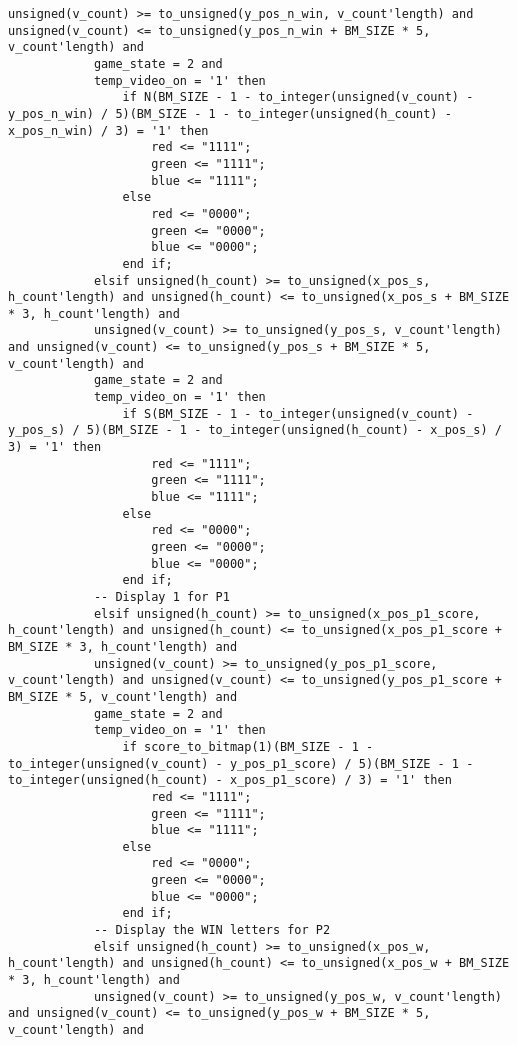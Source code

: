 \documentclass{article}
\begin{document}
\begin{lstlisting}[caption=Draw Process, label=lst:draw-process]
            unsigned(v_count) >= to_unsigned(y_pos_n_win, v_count'length) and unsigned(v_count) <= to_unsigned(y_pos_n_win + BM_SIZE * 5, v_count'length) and
            game_state = 2 and
            temp_video_on = '1' then
                if N(BM_SIZE - 1 - to_integer(unsigned(v_count) - y_pos_n_win) / 5)(BM_SIZE - 1 - to_integer(unsigned(h_count) - x_pos_n_win) / 3) = '1' then
                    red <= "1111";
                    green <= "1111";
                    blue <= "1111";
                else
                    red <= "0000";
                    green <= "0000";
                    blue <= "0000";
                end if;
            elsif unsigned(h_count) >= to_unsigned(x_pos_s, h_count'length) and unsigned(h_count) <= to_unsigned(x_pos_s + BM_SIZE * 3, h_count'length) and
            unsigned(v_count) >= to_unsigned(y_pos_s, v_count'length) and unsigned(v_count) <= to_unsigned(y_pos_s + BM_SIZE * 5, v_count'length) and
            game_state = 2 and
            temp_video_on = '1' then
                if S(BM_SIZE - 1 - to_integer(unsigned(v_count) - y_pos_s) / 5)(BM_SIZE - 1 - to_integer(unsigned(h_count) - x_pos_s) / 3) = '1' then
                    red <= "1111";
                    green <= "1111";
                    blue <= "1111";
                else
                    red <= "0000";
                    green <= "0000";
                    blue <= "0000";
                end if;
            -- Display 1 for P1
            elsif unsigned(h_count) >= to_unsigned(x_pos_p1_score, h_count'length) and unsigned(h_count) <= to_unsigned(x_pos_p1_score + BM_SIZE * 3, h_count'length) and
            unsigned(v_count) >= to_unsigned(y_pos_p1_score, v_count'length) and unsigned(v_count) <= to_unsigned(y_pos_p1_score + BM_SIZE * 5, v_count'length) and
            game_state = 2 and
            temp_video_on = '1' then
                if score_to_bitmap(1)(BM_SIZE - 1 - to_integer(unsigned(v_count) - y_pos_p1_score) / 5)(BM_SIZE - 1 - to_integer(unsigned(h_count) - x_pos_p1_score) / 3) = '1' then
                    red <= "1111";
                    green <= "1111";
                    blue <= "1111";
                else
                    red <= "0000";
                    green <= "0000";
                    blue <= "0000";
                end if;
            -- Display the WIN letters for P2
            elsif unsigned(h_count) >= to_unsigned(x_pos_w, h_count'length) and unsigned(h_count) <= to_unsigned(x_pos_w + BM_SIZE * 3, h_count'length) and
            unsigned(v_count) >= to_unsigned(y_pos_w, v_count'length) and unsigned(v_count) <= to_unsigned(y_pos_w + BM_SIZE * 5, v_count'length) and

\end{lstlisting}
\end{document}
